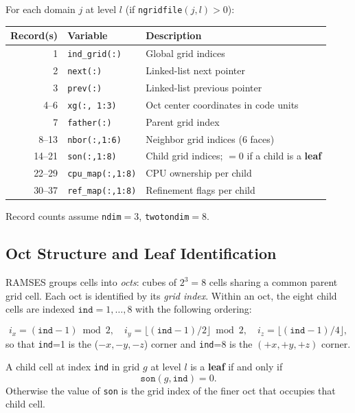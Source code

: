 \documentclass[english,a4paper]{my_memo}
\begin{document}
For each domain $j$ at level $l$ (if \texttt{ngridfile}$(j,l) > 0$):

\begin{center}
\begin{tabular}{rll}
\toprule
Record(s) & Variable & Description \\
\midrule
1     & \texttt{ind\_grid(:)}  & Global grid indices \\
2     & \texttt{next(:)}       & Linked-list next pointer \\
3     & \texttt{prev(:)}       & Linked-list previous pointer \\
4--6  & \texttt{xg(:, 1:3)}   & Oct center coordinates in code units \\
7     & \texttt{father(:)}     & Parent grid index \\
8--13 & \texttt{nbor(:,1:6)}  & Neighbor grid indices (6 faces) \\
14--21 & \texttt{son(:,1:8)}  & Child grid indices; $=0$ if a child is a \textbf{leaf} \\
22--29 & \texttt{cpu\_map(:,1:8)} & CPU ownership per child \\
30--37 & \texttt{ref\_map(:,1:8)} & Refinement flags per child \\
\bottomrule
\end{tabular}
\end{center}

Record counts assume \texttt{ndim}$=3$, \texttt{twotondim}$=8$.

\subsection{Oct Structure and Leaf Identification}

RAMSES groups cells into \emph{octs}: cubes of $2^3 = 8$ cells sharing a
common parent grid cell.  Each oct is identified by its \emph{grid index}.
Within an oct, the eight child cells are indexed $\texttt{ind} = 1, \ldots, 8$
with the following ordering:

\begin{equation}
  i_x = (\texttt{ind}-1) \bmod 2, \quad
  i_y = \lfloor(\texttt{ind}-1)/2\rfloor \bmod 2, \quad
  i_z = \lfloor(\texttt{ind}-1)/4\rfloor,
\end{equation}
so that \texttt{ind}=1 is the ($-x,-y,-z$) corner and \texttt{ind}=8 is the
$(+x,+y,+z)$ corner.

A child cell at index \texttt{ind} in grid $g$ at level $l$ is a
\textbf{leaf} if and only if
\begin{equation}
  \texttt{son}(g, \texttt{ind}) = 0.
\end{equation}
Otherwise the value of \texttt{son} is the grid index of the finer oct that
occupies that child cell.
\end{document}
